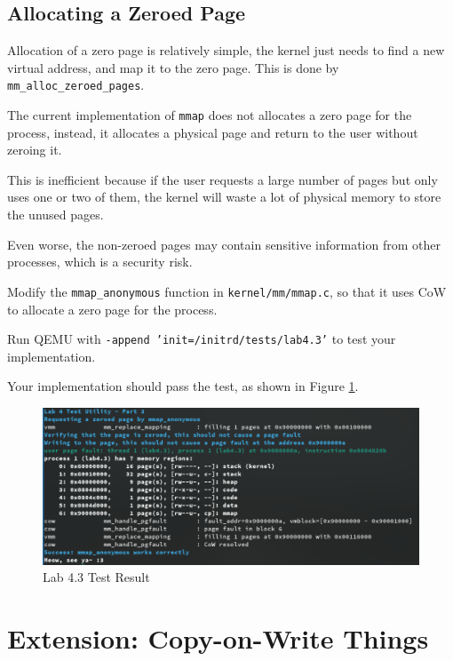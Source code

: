 \subsection{Allocating a Zeroed Page}

Allocation of a zero page is relatively simple, the kernel just needs to
find a new virtual address, and map it to the zero page. This is done by
\texttt{mm\_alloc\_zeroed\_pages}.

The current implementation of \texttt{mmap} does not allocates a zero page
for the process, instead, it allocates a physical page and return to
the user without zeroing it.

This is inefficient because if the user requests a large number of pages but
only uses one or two of them, the kernel will waste a lot of physical memory
to store the unused pages.

Even worse, the non-zeroed pages may contain sensitive information from
other processes, which is a security risk.

\begin{exercise}
    \item Modify the \texttt{mmap\_anonymous} function in \texttt{kernel/mm/mmap.c},
    so that it uses CoW to allocate a zero page for the process.
    \item Run QEMU with \texttt{-append 'init=/initrd/tests/lab4.3'} to test your
    implementation.

    Your implementation should pass the test, as shown in Figure \ref{fig:lab4.3}.

    \begin{figure}[H]
        \centering
        \includegraphics[width=0.8\linewidth]{assets/c4.mmap.png}
        \caption{Lab 4.3 Test Result}
        \label{fig:lab4.3}
    \end{figure}
\end{exercise}

\section{Extension: Copy-on-Write Things}

